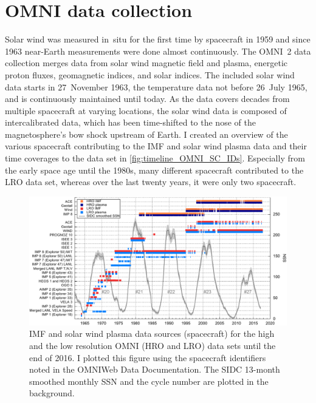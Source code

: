 \section{OMNI data collection}
\label{sec:omni_data_collection}
Solar wind was measured in~situ for the first time by spacecraft in 1959 and since 1963 near-Earth measurements were done almost continuously. The OMNI~2 data collection \citep{King2005} merges data from solar wind magnetic field and plasma, energetic proton fluxes, geomagnetic indices, and solar indices. The included solar wind data starts in 27~November 1963, the temperature data not before 26~July 1965, and is continuously maintained until today. As the data covers decades from multiple spacecraft at varying locations, the solar wind data is composed of intercalibrated data, which has been time-shifted to the nose of the magnetosphere's bow shock upstream of Earth. I created an overview of the various spacecraft contributing to the IMF and solar wind plasma data and their time coverages to the data set in \autoref{fig:timeline_OMNI_SC_IDs}. Especially from the early space age until the 1980s, many different spacecraft contributed to the LRO data set, whereas over the last twenty years, it were only two spacecraft.
\begin{figure}[htb]
	\centering
	\includegraphics[width=\textwidth]{figures_of_mine/gnuplots/timeline_OMNI_SC_IDs.pdf}
	\caption[I created the figure myself.]
	{IMF and solar wind plasma data sources (spacecraft) for the high and the low resolution OMNI (HRO and LRO) data sets until the end of 2016. I plotted this figure using the spacecraft identifiers noted in the OMNIWeb Data Documentation\protect\footnotemark. The SIDC 13-month smoothed monthly SSN and the cycle number are plotted in the background.}
	\label{fig:timeline_OMNI_SC_IDs}
\end{figure}

